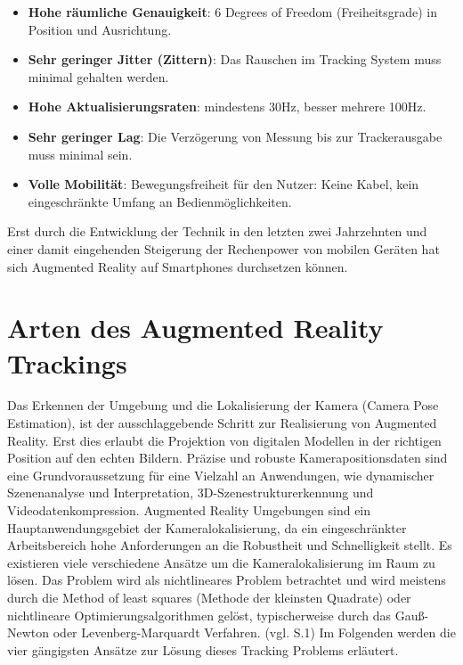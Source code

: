 \begin{itemize}

\item \textbf{Hohe räumliche Genauigkeit}: 6 \glqq Degrees of Freedom\grqq{} (Freiheitsgrade) in Position und Ausrichtung. 

\item \textbf{Sehr geringer Jitter (Zittern)}: Das Rauschen im Tracking System muss minimal gehalten werden.

\item \textbf{Hohe Aktualisierungsraten}: mindestens 30Hz, besser mehrere 100Hz.

\item \textbf{Sehr geringer Lag}: Die Verzögerung von Messung bis zur Trackerausgabe muss minimal sein.

\item \textbf{Volle Mobilität}: Bewegungsfreiheit für den Nutzer: Keine Kabel, kein eingeschränkte Umfang an Bedienmöglichkeiten.
\end{itemize}

Erst durch die Entwicklung der Technik in den letzten zwei Jahrzehnten und einer damit eingehenden Steigerung der Rechenpower von mobilen Geräten hat sich Augmented Reality auf Smartphones durchsetzen können.

\section{Arten des Augmented Reality Trackings}

Das Erkennen der Umgebung und die Lokalisierung der Kamera (Camera Pose Estimation), ist der ausschlaggebende Schritt zur Realisierung von Augmented Reality. Erst dies erlaubt die Projektion von digitalen Modellen in der richtigen Position auf den echten Bildern. Präzise und robuste Kamerapositionsdaten sind eine Grundvoraussetzung für eine Vielzahl an Anwendungen, wie dynamischer Szenenanalyse und Interpretation, 3D-Szenestrukturerkennung und Videodatenkompression. Augmented Reality Umgebungen sind ein Hauptanwendungsgebiet der Kameralokalisierung, da ein eingeschränkter Arbeitsbereich hohe Anforderungen an die Robustheit und Schnelligkeit stellt. Es existieren viele verschiedene Ansätze um die Kameralokalisierung im Raum zu lösen. Das Problem wird als nichtlineares Problem betrachtet und wird meistens durch die \glqq Method of least squares\grqq{} (Methode der kleinsten Quadrate) oder nichtlineare Optimierungsalgorithmen gelöst, typischerweise durch das Gauß-Newton oder Levenberg-Marquardt Verfahren. (vgl. \cite{camera_pose} S.1) Im Folgenden werden die vier gängigsten Ansätze zur Lösung dieses Tracking Problems erläutert. 


